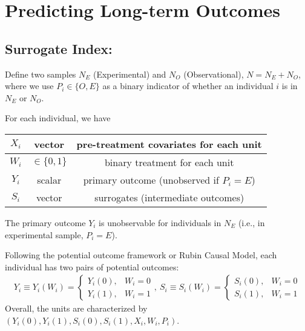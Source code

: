 \chapter{Predicting Long-term Outcomes}
\section{Surrogate Index: \cite{athey2019surrogate}}
Define two samples $N_E$ (Experimental) and $N_O$ (Observational), $N=N_E+N_O$, where we use $P_i\in\{O,E\}$ as a binary indicator of whether an individual $i$ is in $N_E$ or $N_O$.

For each individual, we have
\begin{center}
    \begin{tabular}{ccc}
        \hline
            $X_i$& vector & pre-treatment covariates for each unit\\
        \hline
            $W_i$& $\in\{0,1\}$ & binary treatment for each unit\\
        \hline
            $Y_i$& scalar & primary outcome (unobserved if $P_i=E$)\\
            $S_i$& vector &surrogates (intermediate outcomes)\\
        \hline
    \end{tabular}
\end{center}
The primary outcome $Y_i$ is unobservable for individuals in $N_E$ (i.e., in experimental sample, $P_i=E$).

Following the potential outcome framework or Rubin Causal Model, each individual has two pairs of potential outcomes:
\begin{equation}
    \begin{aligned}
        Y_i\equiv Y_i(W_i)=\left\{\begin{matrix}
            Y_i(0),& W_i=0\\
            Y_i(1),& W_i=1
        \end{matrix}\right.,\ S_i\equiv S_i(W_i)=\left\{\begin{matrix}
            S_i(0),& W_i=0\\
            S_i(1),& W_i=1
        \end{matrix}\right.
    \end{aligned}
    \nonumber
\end{equation}
Overall, the units are characterized by $(Y_i(0),Y_i(1),S_i(0),S_i(1),X_i,W_i,P_i)$.
